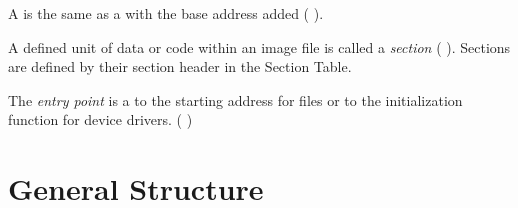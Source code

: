 \begin{definition}[VA]
A \emph{\VA{}} is the same as a \RVA{} with the base address added (\cf{} \cite[]{pespec}).
\end{definition} 

\begin{definition}[section]
A defined unit of data or code within an image file is called a \emph{section} (\cf{} \cite[]{pespec}). Sections are defined by their section header in the Section Table.
\end{definition} 

\begin{definition}
The \emph{entry point} is a \RVA{} to the starting address for \EXE{} files or to the initialization function for device drivers. (\cf{} \cite[]{pespec}) \label{def:entrypoint} 
\end{definition} 

\section{General Structure} \label{sec:pestructure}

